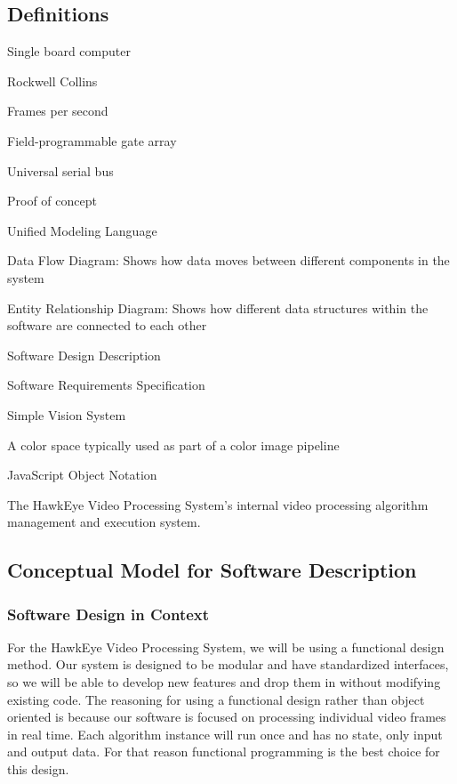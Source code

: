 \subsection{Definitions}
\begin{description}[leftmargin=2cm,labelindent=2cm]
	\item [SBC] Single board computer
	\item [RC] Rockwell Collins
	\item [FPS] Frames per second
	\item [FPGA] Field-programmable gate array
	\item [USB] Universal serial bus
	\item [PoC] Proof of concept
	\item [UML] Unified Modeling Language
	\item [DFD] Data Flow Diagram: Shows how data moves between different components in the system
	\item [ER Diagram] Entity Relationship Diagram: Shows how different data structures within the software are connected to each other
	\item [SDD] Software Design Description
	\item [SRS] Software Requirements Specification
	\item [SVS] Simple Vision System
	\item [YUV] A color space typically used as part of a color image pipeline
	\item [JSON] JavaScript Object Notation
	\item [Modular Video Processing System] The HawkEye Video Processing System's internal video processing algorithm management and execution system.\\
\end{description}

\subsection{Conceptual Model for Software Description}
\subsubsection{Software Design in Context}
For the HawkEye Video Processing System, we will be using a functional design method. Our
system is designed to be modular and have standardized interfaces, so we will be able to develop new
features and drop them in without modifying existing code. The reasoning for using a functional design
rather than object oriented is because our software is focused on processing individual video frames in
real time. Each algorithm instance will run once and has no state, only input and output data. For that
reason functional programming is the best choice for this design.\\

